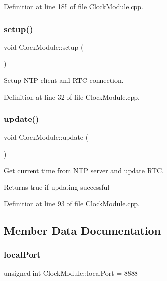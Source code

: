 Definition at line 185 of file Clock\+Module.\+cpp.

\mbox{\label{class_clock_module_a6113cfe778efff0aa237696f85516796}} 
\subsubsection{\texorpdfstring{setup()}{setup()}}
{\footnotesize\ttfamily void Clock\+Module\+::setup (\begin{DoxyParamCaption}{ }\end{DoxyParamCaption})}

Setup N\+TP client and R\+TC connection. 

Definition at line 32 of file Clock\+Module.\+cpp.

\mbox{\label{class_clock_module_afbc823bb09d912dbdc25f9d38ec78624}} 
\subsubsection{\texorpdfstring{update()}{update()}}
{\footnotesize\ttfamily void Clock\+Module\+::update (\begin{DoxyParamCaption}{ }\end{DoxyParamCaption})}

Get current time from N\+TP server and update R\+TC. \begin{DoxyReturn}{Returns}
true if updating successful 
\end{DoxyReturn}


Definition at line 93 of file Clock\+Module.\+cpp.



\subsection{Member Data Documentation}
\mbox{\label{class_clock_module_a0ea28a7086d25b525ae2ae7e8ac05004}} 
\subsubsection{\texorpdfstring{localPort}{localPort}}
{\footnotesize\ttfamily unsigned int Clock\+Module\+::local\+Port = 8888\hspace{0.3cm}{\ttfamily [private]}}




